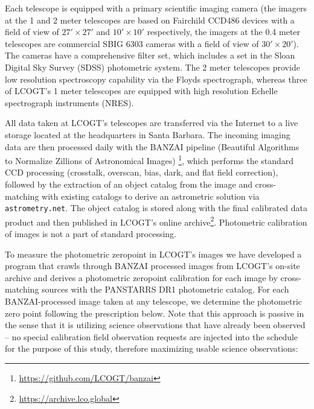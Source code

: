 \documentclass[]{spieman}
\begin{document}
Each telescope is equipped with a primary scientific imaging camera (the imagers at the 1 and 2
meter telescopes are based on Fairchild CCD486 devices with a field of view of $27' \times 27'$ and
$10' \times 10'$ respectively, the imagers at the 0.4 meter telescopes are commercial SBIG 6303
cameras with a field of view of $30' \times 20'$). The cameras have a comprehensive filter set,
which includes a set in the Sloan Digital Sky Survey (SDSS) photometric system\cite{fukugita1996}.
The 2 meter telescopes provide low resolution spectroscopy capability via the
Floyds\cite{brown2013} spectrograph, whereas three of LCOGT's 1 meter telescopes are equipped with
high resolution Echelle spectrograph instruments (NRES)\cite{eastman2014,siverd2016}.

All data taken at LCOGT's telescopes are transferred via the Internet to a live storage located at
the headquarters in Santa Barbara. The incoming imaging data are then processed daily with the BANZAI
pipeline (Beautiful Algorithms to Normalize Zillions of Astronomical Images)
\cite{mccully2018}\footnote{\url{https://github.com/LCOGT/banzai}}, which  performs the standard
CCD processing (crosstalk, overscan, bias, dark, and flat field correction), followed by the
extraction of an object catalog from the image and cross-matching with existing catalogs to derive an
astrometric solution via {\tt astrometry.net}\cite{lang2010}. The object catalog is stored along
with the final calibrated data product and then published in LCOGT's online
archive\footnote{\url{https://archive.lco.global}}. Photometric calibration of images is not a part
of standard processing.

To measure the photometric zeropoint in LCOGT's images we have developed a program that crawls
through BANZAI processed images from LCOGT's on-site archive and derives a photometric zeropoint
calibration for each image by cross-matching sources with the PANSTARRS DR1 photometric
catalog\cite{chambers2016}. For each BANZAI-processed image taken at any telescope, we determine the
photometric zero point following the prescription below. Note that this approach is passive in the
sense that it is utilizing science observations that have already been observed -- no special
calibration field observation requests are injected into the schedule for the purpose of this
study, therefore maximizing usable science observations:
\end{document}
